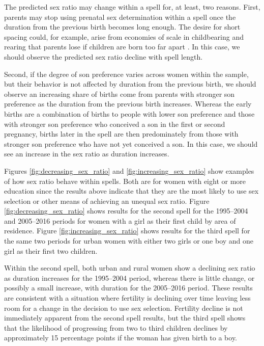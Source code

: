 \documentclass[12pt,letterpaper]{article}
\begin{document}
The predicted sex ratio may change within a spell for, at
least, two reasons.
First, parents may stop using prenatal sex determination within
a spell once the duration from the previous birth becomes long enough.
The desire for short spacing could, for example, arise from 
economies of scale in childbearing and rearing that parents lose 
if children are born too far apart \citep[p 374]{schultz97}. 
In this case, we should observe the predicted sex ratio decline
with spell length.

Second, if the degree of son preference varies across women within 
the sample, but their behavior is not affected by duration from the 
previous birth, we should observe an increasing share of births come from 
parents with stronger son preference as the duration from the
previous birth increases.
Whereas the early births are a combination of births to
people with lower son preference and those with stronger son
preference who conceived a son in the first or second pregnancy,
births later in the spell are then predominately from those with stronger
son preference who have not yet conceived a son.
In this case, we should see an increase in the sex ratio 
as duration increases.


Figures \ref{fig:decreasing_sex_ratio} and \ref{fig:increasing_sex_ratio} show
examples of how sex ratio behave within spells.
Both are for women with eight or more education since the results above indicate
that they are the most likely to use sex selection or other means of achieving 
an unequal sex ratio.
Figure \ref{fig:decreasing_sex_ratio} shows results for the second spell for
the 1995--2004 and 2005--2016 periods for women with a girl as their first
child by area of residence.
Figure \ref{fig:increasing_sex_ratio} shows results for the third spell for
the same two periods for urban women with either two girls or one boy and one
girl as their first two children.

Within the second spell, both urban and rural women show a declining
sex ratio as duration increases for the 1995--2004 period, whereas there
is little change, or possibly a small increase, with duration for the 
2005--2016 period.
These results are consistent with a situation where fertility is declining
over time leaving less room for a change in the decision to use sex selection.
Fertility decline is not immediately apparent from the second spell 
results, but the third spell shows that the likelihood of progressing from
two to third children declines by approximately 15 percentage points if
the woman has given birth to a boy.
\end{document}
